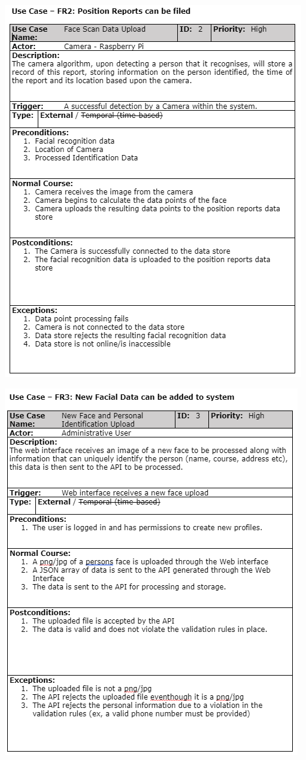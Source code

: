\documentclass[
  english,
  a4paper,
,tablecaptionabove
]{scrartcl}
\begin{document}
\includegraphics{images/ppm-images/use-case-2.png} \newpage

\includegraphics{images/ppm-images/use-case-3.png} \newpage
\end{document}
